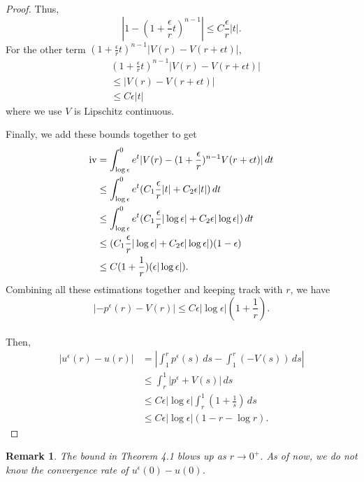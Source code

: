 \documentclass[12pt,reqno]{amsart}
\numberwithin{figure}{section}
\theoremstyle{plain}
\newtheorem*{rem}{\textbf{Remark}}
\numberwithin{equation}{section}
\newcommand{\RNum}[1]{\uppercase\expandafter{\romannumeral #1\relax}}
\begin{document}
\begin{proof}
Thus, 
\begin{equation*}    
|1-(1+\frac{\epsilon}{r}t)^{n-1}|\le C\frac{\epsilon}{r}|t|.
\end{equation*}
For the other term $(1+\frac{\epsilon}{r}t)^{n-1}|V(r)-V(r+\epsilon t)|$,
\begin{equation*}
\begin{aligned}
    &(1+\frac{\epsilon}{r}t)^{n-1}|V(r)-V(r+\epsilon t)|\\
    &\le |V(r)-V(r+\epsilon t)|\\
    &\le C\epsilon|t| 
\end{aligned}
\end{equation*}
where we use $V$ is Lipschitz continuous.

Finally, we add these bounds together to get
\begin{equation*}
\begin{aligned}
    \text{\RNum{4}}&= \int_{\log\epsilon}^{0}e^t|V(r)-(1+\frac{\epsilon}
    {r})^{n-1}V(r+\epsilon t)|\,dt\\
    &\le \int_{\log\epsilon}^{0}e^t(C_1\frac{\epsilon}{r}|t|+C_2\epsilon|t|)\,dt\\
    &\le\int_{\log\epsilon}^{0}e^t(C_1\frac{\epsilon}{r}|\log{\epsilon}|+C_2\epsilon|\log{\epsilon}|)\,dt\\
    &\le (C_1\frac{\epsilon}{r}|\log{\epsilon}|+C_2\epsilon|\log{\epsilon}|)(1-\epsilon)\\
    &\le C(1+\frac{1}{r})(\epsilon|\log{\epsilon}|).
\end{aligned}
\end{equation*}
Combining all these estimations together and keeping track with $r$, we have
$$|-p^{\epsilon}(r)-V(r)|\le C\epsilon|\log{\epsilon}|(1+\frac{1}{r}).$$\\
Then,
\[
\begin{aligned}
    |u^{\epsilon}(r)-u(r)|&=|\int_{1}^{r} p^{\epsilon}(s) \, ds-\int_1^{r}(-V(s))\,ds|\\
    &\le \int_{r}^{1}|p^{\epsilon}+V(s)|\,ds\\
    &\le C\epsilon |\log\epsilon| \int_{r}^{1}(1+\frac{1}{s})\,ds\\
    &\le C\epsilon|\log\epsilon|(1-r-\log r).
\end{aligned}
\]
\end{proof}
\begin{rem}
    The bound in Theorem 4.1 blows up as $r\rightarrow 0^+$. As of now, we do not know the convergence rate of $u^{\epsilon}(0)-u(0)$.
\end{rem}
\end{document}
